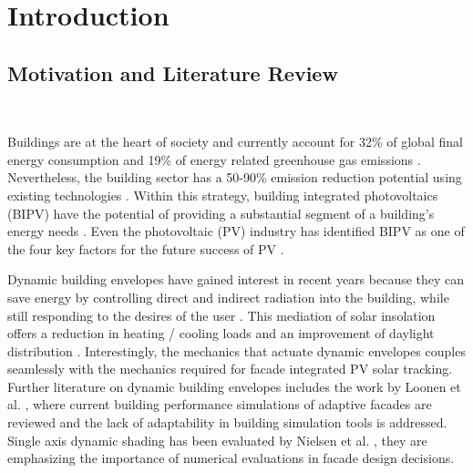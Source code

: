 \chapter{Introduction}


\section{Motivation and Literature Review}\
\label{ch:motivation}

	Buildings are at the heart of society and currently account for 32\% of global final energy consumption and 19\% of energy related greenhouse gas emissions \cite{IPCC}. Nevertheless, the building sector has a 50-90\% emission reduction potential using existing technologies \cite{IPCC}. Within this strategy, building integrated photovoltaics (BIPV) have the potential of providing a substantial segment of a building's energy needs \cite{defaix2012technical}. Even the photovoltaic (PV) industry has identified BIPV as one of the four key factors for the future success of PV \cite{raugei2009life}. 



	Dynamic building envelopes have gained interest in recent years because they can save energy by controlling direct and indirect radiation into the building, while still responding to the desires of the user \cite{loonen2013climate}. This mediation of solar insolation offers a reduction in heating / cooling loads and an improvement of daylight distribution \cite{rossi2012adaptive}. Interestingly, the mechanics that actuate dynamic envelopes couples seamlessly with the mechanics required for facade integrated PV solar tracking. Further literature on dynamic building envelopes includes the work by Loonen et al. \cite{loonen16}, where current building performance simulations of adaptive facades are reviewed and the lack of adaptability in building simulation tools is addressed. Single axis dynamic shading has been evaluated by Nielsen et al. \cite{nielsen2011quantifying}, they are emphasizing the importance of numerical evaluations in facade design decisions. 

